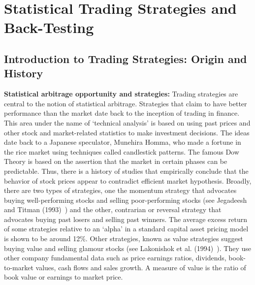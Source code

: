\chapter{Statistical Trading Strategies and Back-Testing\label{ch:stat_ts}}
\section{Introduction to Trading Strategies: Origin and History}

\noindent\textbf{Statistical arbitrage opportunity and strategies:} Trading strategies are central to the notion of statistical arbitrage. Strategies that claim to have better performance than the market date back to the inception of trading in finance. This area under the name of `technical analysis' is based on using past prices and other stock and market-related statistics to make investment decisions. The ideas date back to a Japanese speculator, Munehira Homma, who made a fortune in the rice market using techniques called candlestick patterns. The famous Dow Theory is based on the assertion that the market in certain phases can be predictable. Thus, there is a history of studies that empirically conclude that the behavior of stock prices appear to contradict efficient market hypothesis. Broadly, there are two types of strategies, one the momentum strategy that  advocates buying well-performing stocks and selling poor-performing stocks (see Jegadeesh and Titman (1993)~\cite{JeTit}) and the other, contrarian or reversal strategy that advocates buying past losers and selling past winners. The average excess return of some strategies relative to an `alpha' in a standard capital asset pricing model is shown to be around 12\%. Other strategies, known as value strategies suggest buying value and selling glamour stocks (see Lakonishok et al. (1994)~\cite{Lako}). They use other company fundamental data such as price earnings ratios, dividends, book-to-market values, cash flows and sales growth. A measure of value is the ratio of book value or earnings to market price.


